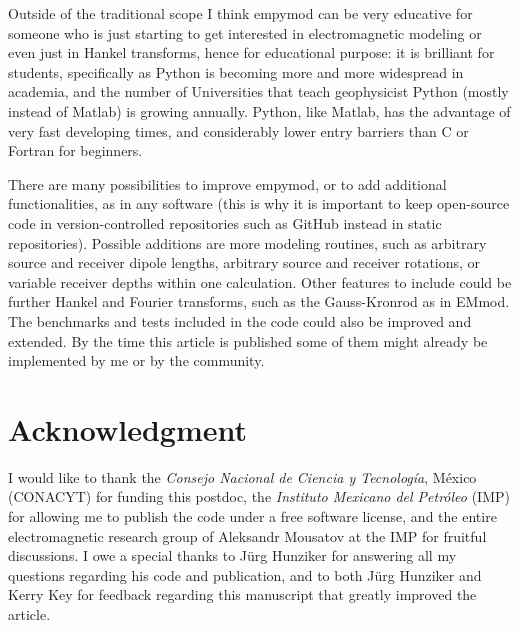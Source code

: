 \documentclass[manuscript]{geophysics}
\newcommand{\tnt}[1]{#1}
\newcommand{\fortran}{\tnt{Fortran}\xspace}
\newcommand{\python}{\tnt{Python}\xspace}
\newcommand{\matlab}{\tnt{Matlab}\xspace}
\newcommand{\cc}{\tnt{C}\xspace}
\newcommand{\emmod}{\tnt{EMmod}\xspace}
\newcommand{\empymod}{\tnt{empymod}\xspace}
\begin{document}
Outside of the traditional scope I think \empymod can be very educative for
someone who is just starting to get interested in electromagnetic modeling or
even just in Hankel transforms, hence for educational purpose: it is brilliant
for students, specifically as \python is becoming more and more widespread in
academia, and the number of Universities that teach geophysicist \python
(mostly instead of \matlab) is growing annually. \python, like \matlab, has the
advantage of very fast developing times, and considerably lower entry barriers
than \cc or \fortran for beginners.

There are many possibilities to improve \empymod, or to add additional
functionalities, as in any software (this is why it is important to keep
open-source code in version-controlled repositories such as GitHub instead in
static repositories). Possible additions are more modeling routines, such as
arbitrary source and receiver dipole lengths, arbitrary source and receiver
rotations, or variable receiver depths within one calculation. Other features
to include could be further Hankel and Fourier transforms, such as the
Gauss-Kronrod as in \emmod. The benchmarks and tests included in the code could
also be improved and extended. By the time this article is published some of
them might already be implemented by me or by the community.

\section{Acknowledgment}

I would like to thank the \emph{Consejo Nacional de Ciencia y Tecnología},
México (CONACYT) for funding this postdoc, the \emph{Instituto Mexicano del
Petróleo} (IMP) for allowing me to publish the code under a free software
license, and the entire electromagnetic research group of Aleksandr Mousatov at
the IMP for fruitful discussions.  I owe a special thanks to Jürg Hunziker for
answering all my questions regarding his code and publication, and to both Jürg
Hunziker and Kerry Key for feedback regarding this manuscript that greatly
improved the article.
\end{document}
